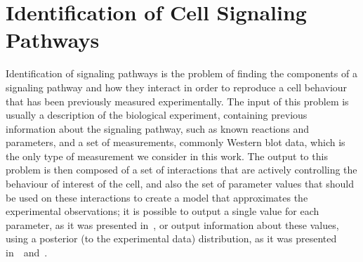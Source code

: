 \section{Identification of Cell Signaling Pathways}
Identification of signaling pathways is the problem of finding the 
components of a signaling pathway and how they interact in order to
reproduce a cell behaviour that has been previously measured 
experimentally. The input of this problem is usually a description of 
the biological experiment, containing previous information about the 
signaling pathway, such as known reactions and parameters, and a set of 
measurements, commonly Western blot data, which is the only type of
measurement we consider in this work. The output to this problem is then
composed of a set of interactions that are actively controlling the
behaviour of interest of the cell, and also the set of parameter values 
that should be used on these interactions to create a model that
approximates the experimental observations; it is possible to output a
single value for each parameter, as it was presented in~\cite{Wu15}, or
output information about these values, using a posterior (to the
experimental data) distribution, as it was presented
in~\cite{Liepe2014}~and~\cite{Xura20}.

